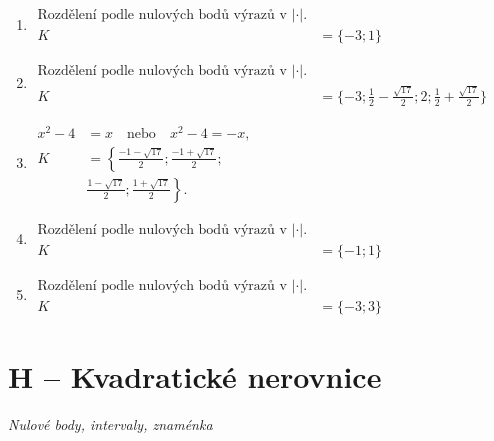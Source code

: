 \documentclass[11pt,a4paper]{article}
\begin{document}
\begin{enumerate}[label={},itemsep=9pt]
\item[\textbf{G008}] \(\displaystyle \begin{aligned}\text{Rozdělení podle nulových bodů výrazů v }|\cdot|.\\ K&=\{-3;1\}\end{aligned}\)\par
\item[\textbf{G009}] \(\displaystyle \begin{aligned}\text{Rozdělení podle nulových bodů výrazů v }|\cdot|.\\ K&=\{-3;\frac{1}{2} - \frac{\sqrt{17}}{2};2;\frac{1}{2} + \frac{\sqrt{17}}{2}\}\end{aligned}\)\par
\item[\textbf{G010}] \(\displaystyle \begin{aligned}x^2-4&=x\quad\text{nebo}\quad x^2-4=-x,\\ K&=\left\{\frac{-1-\sqrt{17}}2;\frac{-1+\sqrt{17}}2;\right.\\ &\left.\frac{1-\sqrt{17}}2;\frac{1+\sqrt{17}}2\right\}.\end{aligned}\)\par
\item[\textbf{G011}] \(\displaystyle \begin{aligned}\text{Rozdělení podle nulových bodů výrazů v }|\cdot|.\\ K&=\{-1;1\}\end{aligned}\)\par
\item[\textbf{G012}] \(\displaystyle \begin{aligned}\text{Rozdělení podle nulových bodů výrazů v }|\cdot|.\\ K&=\{-3;3\}\end{aligned}\)\par
\end{enumerate}
\section*{H -- Kvadratické nerovnice}
\textit{Nulové body, intervaly, znaménka}
\end{document}
